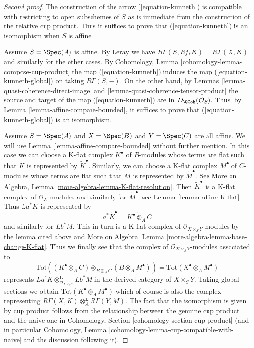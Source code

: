 \begin{proof}[Second proof]
The construction of the arrow (\ref{equation-kunneth}) is compatible
with restricting to open subschemes of $S$ as is immediate from the
construction of the relative cup product. Thus it suffices to prove
that (\ref{equation-kunneth}) is an isomorphism when $S$ is affine.

\medskip\noindent
Assume $S = \Spec(A)$ is affine. By Leray we have
$R\Gamma(S, Rf_*K) = R\Gamma(X, K)$ and similarly for the
other cases. By Cohomology, Lemma \ref{cohomology-lemma-compose-cup-product}
the map (\ref{equation-kunneth}) induces the map
(\ref{equation-kunneth-global}) on taking $R\Gamma(S, -)$.
On the other hand, by
Lemmas \ref{lemma-quasi-coherence-direct-image} and
\ref{lemma-quasi-coherence-tensor-product}
the source and target of the map
(\ref{equation-kunneth}) are in $D_\QCoh(\mathcal{O}_S)$.
Thus, by Lemma \ref{lemma-affine-compare-bounded}, it suffices to prove that
(\ref{equation-kunneth-global}) is an isomorphism.

\medskip\noindent
Assume $S = \Spec(A)$ and $X = \Spec(B)$ and $Y = \Spec(C)$ are all affine.
We will use Lemma \ref{lemma-affine-compare-bounded} without further mention.
In this case we can choose a K-flat complex $K^\bullet$ of $B$-modules
whose terms are flat such that $K$ is represented by $\widetilde{K}^\bullet$.
Similarly, we can choose a K-flat complex $M^\bullet$ of $C$-modules
whose terms are flat such that $M$ is represented by $\widetilde{M}^\bullet$.
See More on Algebra, Lemma \ref{more-algebra-lemma-K-flat-resolution}.
Then $\widetilde{K}^\bullet$ is a K-flat complex of $\mathcal{O}_X$-modules
and similarly for $\widetilde{M}^\bullet$, see
Lemma \ref{lemma-affine-K-flat}. Thus
$La^*K$ is represented by
$$
a^*\widetilde{K}^\bullet = \widetilde{K^\bullet \otimes_A C}
$$
and similarly for $Lb^*M$. This in turn is a K-flat complex
of $\mathcal{O}_{X \times_S Y}$-modules by the lemma cited above
and More on Algebra, Lemma \ref{more-algebra-lemma-base-change-K-flat}.
Thus we finally see that the complex of
$\mathcal{O}_{X \times_S Y}$-modules associated to
$$
\text{Tot}((K^\bullet \otimes_A C) \otimes_{B \otimes_A C}
(B \otimes_A M^\bullet)) =
\text{Tot}(K^\bullet \otimes_A M^\bullet)
$$
represents $La^*K \otimes_{\mathcal{O}_{X \times_S Y}}^\mathbf{L} Lb^*M$
in the derived category of $X \times_S Y$. Taking global sections
we obtain $\text{Tot}(K^\bullet \otimes_A M^\bullet)$ which of course
is also the complex representing
$R\Gamma(X, K) \otimes_A^\mathbf{L} R\Gamma(Y, M)$.
The fact that the isomorphism is given by cup product follows from the
relationship between the genuine cup product and the naive one
in Cohomology, Section \ref{cohomology-section-cup-product}
(and in particular
Cohomology, Lemma \ref{cohomology-lemma-cup-compatible-with-naive}
and the discussion following it).


\end{proof}
